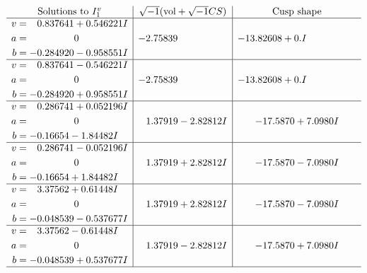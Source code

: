 \documentclass[1p]{elsarticle_modified}
\theoremstyle{definition}
\newcommand{\I}{\sqrt{-1}}
\begin{document}
$$\begin{array}{c|c|c}  
\text{Solutions to }I^v_{1}& \I (\text{vol} + \sqrt{-1}CS) & \text{Cusp shape}\\
 \hline 
\begin{aligned}
v &= \phantom{-}0.837641 + 0.546221 I \\
a &= \phantom{-0.000000 } 0 \\
b &= -0.284920 - 0.958551 I\end{aligned}
 & -2.75839\phantom{ +0.000000I} & -13.82608 + 0. I\phantom{ +0.000000I} \\ \hline\begin{aligned}
v &= \phantom{-}0.837641 - 0.546221 I \\
a &= \phantom{-0.000000 } 0 \\
b &= -0.284920 + 0.958551 I\end{aligned}
 & -2.75839\phantom{ +0.000000I} & -13.82608 + 0. I\phantom{ +0.000000I} \\ \hline\begin{aligned}
v &= \phantom{-}0.286741 + 0.052196 I \\
a &= \phantom{-0.000000 } 0 \\
b &= -0.16654 - 1.84482 I\end{aligned}
 & \phantom{-}1.37919 - 2.82812 I & -17.5870 + 7.0980 I \\ \hline\begin{aligned}
v &= \phantom{-}0.286741 - 0.052196 I \\
a &= \phantom{-0.000000 } 0 \\
b &= -0.16654 + 1.84482 I\end{aligned}
 & \phantom{-}1.37919 + 2.82812 I & -17.5870 - 7.0980 I \\ \hline\begin{aligned}
v &= \phantom{-}3.37562 + 0.61448 I \\
a &= \phantom{-0.000000 } 0 \\
b &= -0.048539 - 0.537677 I\end{aligned}
 & \phantom{-}1.37919 + 2.82812 I & -17.5870 - 7.0980 I \\ \hline\begin{aligned}
v &= \phantom{-}3.37562 - 0.61448 I \\
a &= \phantom{-0.000000 } 0 \\
b &= -0.048539 + 0.537677 I\end{aligned}
 & \phantom{-}1.37919 - 2.82812 I & -17.5870 + 7.0980 I\\
 \hline 
 \end{array}$$\newpage
\end{document}
